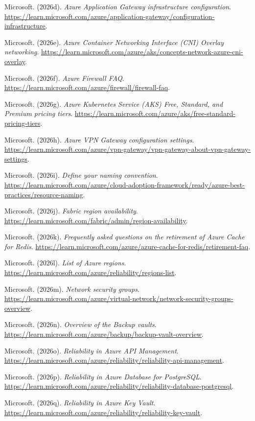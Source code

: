 \documentclass[11pt]{article}
\begin{document}
Microsoft. (2026d). \textit{Azure Application Gateway infrastructure configuration}. \url{https://learn.microsoft.com/azure/application-gateway/configuration-infrastructure}.

Microsoft. (2026e). \textit{Azure Container Networking Interface (CNI) Overlay networking}. \url{https://learn.microsoft.com/azure/aks/concepts-network-azure-cni-overlay}.

Microsoft. (2026f). \textit{Azure Firewall FAQ}. \url{https://learn.microsoft.com/azure/firewall/firewall-faq}.

Microsoft. (2026g). \textit{Azure Kubernetes Service (AKS) Free, Standard, and Premium pricing tiers}. \url{https://learn.microsoft.com/azure/aks/free-standard-pricing-tiers}.

Microsoft. (2026h). \textit{Azure VPN Gateway configuration settings}. \url{https://learn.microsoft.com/azure/vpn-gateway/vpn-gateway-about-vpn-gateway-settings}.

Microsoft. (2026i). \textit{Define your naming convention}. \url{https://learn.microsoft.com/azure/cloud-adoption-framework/ready/azure-best-practices/resource-naming}.

Microsoft. (2026j). \textit{Fabric region availability}. \url{https://learn.microsoft.com/fabric/admin/region-availability}.

Microsoft. (2026k). \textit{Frequently asked questions on the retirement of Azure Cache for Redis}. \url{https://learn.microsoft.com/azure/azure-cache-for-redis/retirement-faq}.

Microsoft. (2026l). \textit{List of Azure regions}. \url{https://learn.microsoft.com/azure/reliability/regions-list}.

Microsoft. (2026m). \textit{Network security groups}. \url{https://learn.microsoft.com/azure/virtual-network/network-security-groups-overview}.

Microsoft. (2026n). \textit{Overview of the Backup vaults}. \url{https://learn.microsoft.com/azure/backup/backup-vault-overview}.

Microsoft. (2026o). \textit{Reliability in Azure API Management}. \url{https://learn.microsoft.com/azure/reliability/reliability-api-management}.

Microsoft. (2026p). \textit{Reliability in Azure Database for PostgreSQL}. \url{https://learn.microsoft.com/azure/reliability/reliability-database-postgresql}.

Microsoft. (2026q). \textit{Reliability in Azure Key Vault}. \url{https://learn.microsoft.com/azure/reliability/reliability-key-vault}.
\end{document}
